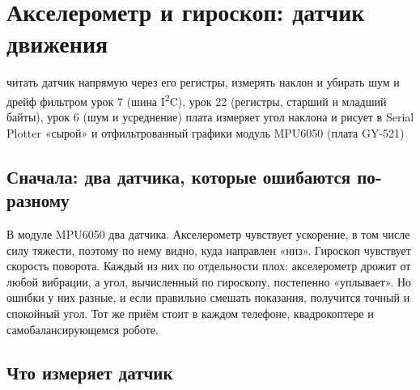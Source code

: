 \section{Акселерометр и гироскоп: датчик движения}
\lessonintro
  {читать датчик напрямую через его регистры, измерять наклон и убирать шум и дрейф фильтром}
  {урок 7 (шина I\textsuperscript{2}C), урок 22 (регистры, старший и младший байты), урок 6 (шум и усреднение)}
  {плата измеряет угол наклона и рисует в Serial Plotter «сырой» и отфильтрованный графики}
  {модуль MPU6050 (плата GY-521)}

\subsection{Сначала: два датчика, которые ошибаются по-разному}

В модуле MPU6050 два датчика. Акселерометр чувствует ускорение, в том числе силу тяжести, поэтому по
нему видно, куда направлен «низ». Гироскоп чувствует скорость поворота. Каждый из них по отдельности
плох: акселерометр дрожит от любой вибрации, а угол, вычисленный по гироскопу, постепенно «уплывает».
Но ошибки у них разные, и если правильно смешать показания, получится точный и спокойный угол. Тот же
приём стоит в каждом телефоне, квадрокоптере и самобалансирующемся роботе.

\subsection{Что измеряет датчик}

